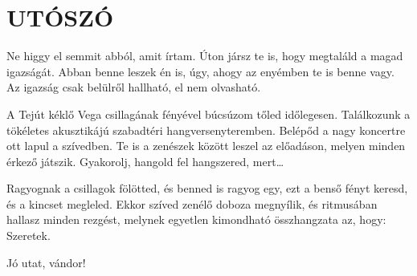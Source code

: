 \clearpage
\chapter{UTÓSZÓ}

\begin{itshape}\otherfamily
Ne higgy el semmit abból, amit írtam. Úton jársz te is, hogy megtaláld a
magad igazságát. Abban benne leszek én is, úgy, ahogy az enyémben te is
benne vagy. Az igazság csak belülről hallható, el nem olvasható.

A Tejút kéklő Vega csillagának fényével búcsúzom tőled időlegesen.
Találkozunk a tökéletes a\-kusztikájú szabadtéri hangversenyteremben.
Belépőd a nagy koncertre ott lapul a szívedben. Te is a zenészek között
leszel az előadáson, melyen minden érkező játszik. Gyakorolj, hangold fel
hangszered, mert\dots

Ragyognak a csillagok fölötted, és benned is ragyog egy, ezt a benső fényt
keresd, és a kincset megleled. Ekkor szíved zenélő doboza megnyílik, és
ritmusában hallasz minden rezgést, melynek egyetlen kimondható összhangzata
az, hogy: Szeretek.

\bigskip
Jó utat, vándor!
\end{itshape}

